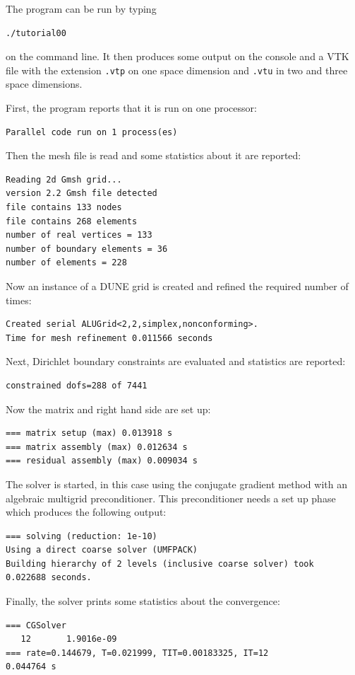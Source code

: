 \documentclass[a4paper,12pt]{article}
\begin{document}
The program can be run by typing

\begin{lstlisting}[basicstyle=\ttfamily\small,
frame=single,
backgroundcolor=\color{listingbg}]
./tutorial00
\end{lstlisting}
on the command line. It then produces some output on the console
and a VTK file with the extension \lstinline{.vtp} on one space
dimension and \lstinline{.vtu} in two and three space dimensions.

First, the program reports that it is run on one processor:
\begin{lstlisting}[basicstyle=\ttfamily\small,
frame=single,
backgroundcolor=\color{listingbg}]
Parallel code run on 1 process(es)
\end{lstlisting}
Then the mesh file is read and some statistics about it are reported:
\begin{lstlisting}[basicstyle=\ttfamily\small,
frame=single,
backgroundcolor=\color{listingbg}]
Reading 2d Gmsh grid...
version 2.2 Gmsh file detected
file contains 133 nodes
file contains 268 elements
number of real vertices = 133
number of boundary elements = 36
number of elements = 228
\end{lstlisting}
Now an instance of a DUNE grid is created and refined the required number of times:
\begin{lstlisting}[basicstyle=\ttfamily\small,
frame=single,
backgroundcolor=\color{listingbg}]
Created serial ALUGrid<2,2,simplex,nonconforming>.
Time for mesh refinement 0.011566 seconds
\end{lstlisting}
Next, Dirichlet boundary constraints are evaluated and statistics are reported:
\begin{lstlisting}[basicstyle=\ttfamily\small,
frame=single,
backgroundcolor=\color{listingbg}]
constrained dofs=288 of 7441
\end{lstlisting}
Now the matrix and right hand side are set up:
\begin{lstlisting}[basicstyle=\ttfamily\small,
frame=single,
backgroundcolor=\color{listingbg}]
=== matrix setup (max) 0.013918 s
=== matrix assembly (max) 0.012634 s
=== residual assembly (max) 0.009034 s
\end{lstlisting}
The solver is started, in this case using the conjugate gradient method 
with an algebraic multigrid preconditioner. This preconditioner needs
a set up phase which produces the following output:
\begin{lstlisting}[basicstyle=\ttfamily\small,
frame=single,
backgroundcolor=\color{listingbg}]
=== solving (reduction: 1e-10) 
Using a direct coarse solver (UMFPACK)
Building hierarchy of 2 levels (inclusive coarse solver) took 
0.022688 seconds.
\end{lstlisting}
Finally, the solver prints some statistics about the convergence:
\begin{lstlisting}[basicstyle=\ttfamily\small,
frame=single,
backgroundcolor=\color{listingbg}]
=== CGSolver
   12       1.9016e-09
=== rate=0.144679, T=0.021999, TIT=0.00183325, IT=12
0.044764 s
\end{lstlisting}
\end{document}
